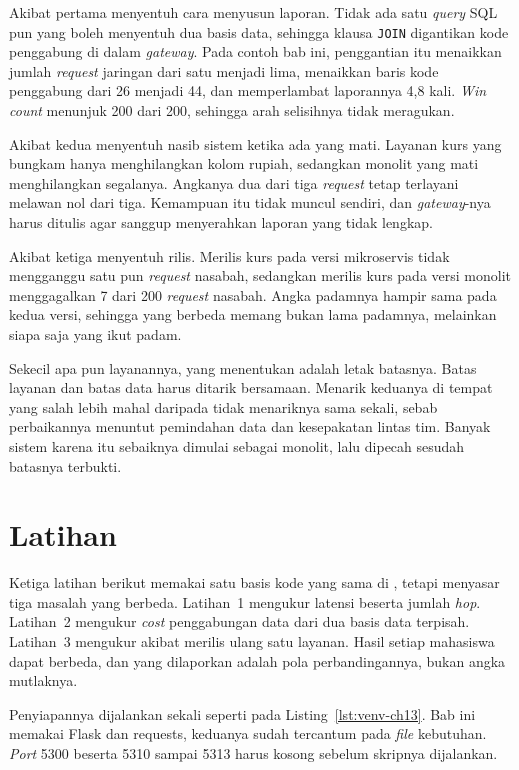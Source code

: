 Akibat pertama menyentuh cara menyusun laporan. Tidak ada satu \textit{query} SQL pun
yang boleh menyentuh dua basis data, sehingga klausa \texttt{JOIN} digantikan
kode penggabung di dalam \textit{gateway}. Pada contoh bab ini, penggantian itu menaikkan
jumlah \textit{request} jaringan dari satu menjadi lima, menaikkan baris kode
penggabung dari 26 menjadi 44, dan memperlambat laporannya 4,8 kali.
\textit{Win count} menunjuk 200 dari 200, sehingga arah selisihnya tidak
meragukan.

Akibat kedua menyentuh nasib sistem ketika ada yang mati. Layanan kurs yang
bungkam hanya menghilangkan kolom rupiah, sedangkan monolit yang mati
menghilangkan segalanya. Angkanya dua dari tiga \textit{request} tetap terlayani
melawan nol dari tiga. Kemampuan itu tidak muncul sendiri, dan \textit{gateway}-nya harus
ditulis agar sanggup menyerahkan laporan yang tidak lengkap.

Akibat ketiga menyentuh rilis. Merilis kurs pada versi mikroservis tidak
mengganggu satu pun \textit{request} nasabah, sedangkan merilis kurs pada versi
monolit menggagalkan 7 dari 200 \textit{request} nasabah. Angka padamnya hampir sama
pada kedua versi, sehingga yang berbeda memang bukan lama padamnya, melainkan
siapa saja yang ikut padam.

Sekecil apa pun layanannya, yang menentukan adalah letak batasnya. Batas layanan
dan batas data harus ditarik bersamaan. Menarik keduanya di tempat yang salah
lebih mahal daripada tidak menariknya sama sekali, sebab perbaikannya menuntut
pemindahan data dan kesepakatan lintas tim. Banyak sistem karena itu sebaiknya
dimulai sebagai monolit, lalu dipecah sesudah batasnya terbukti.

\section{Latihan}

Ketiga latihan berikut memakai satu basis kode yang sama di
, tetapi menyasar tiga masalah yang berbeda.
Latihan~1 mengukur latensi beserta jumlah \textit{hop}. Latihan~2 mengukur \textit{cost}
penggabungan data dari dua basis data terpisah. Latihan~3 mengukur akibat
merilis ulang satu layanan. Hasil setiap mahasiswa dapat berbeda, dan yang
dilaporkan adalah pola perbandingannya, bukan angka mutlaknya.

Penyiapannya dijalankan sekali seperti pada Listing~\ref{lst:venv-ch13}. Bab ini
memakai Flask dan requests, keduanya sudah tercantum pada \textit{file} kebutuhan.
\textit{Port} 5300 beserta 5310 sampai 5313 harus kosong sebelum skripnya dijalankan.

